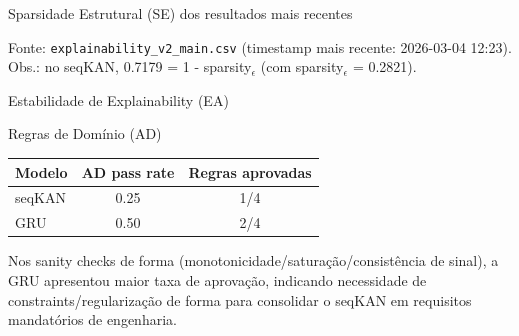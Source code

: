 \documentclass[10pt]{beamer}
\begin{document}
\begin{frame}{Sparsidade Estrutural (SE) dos resultados mais recentes}
\scriptsize
\centering
{}

\vspace{0.5em}
\tiny
Fonte: \texttt{explainability\_v2\_main.csv} (timestamp mais recente: 2026-03-04 12:23).\\
Obs.: no seqKAN, 0.7179 = 1 - sparsity$_\epsilon$ (com sparsity$_\epsilon$ = 0.2821).
\end{frame}

 


\begin{frame}{Estabilidade de Explainability (EA)}
\scriptsize
\centering
{}
\end{frame}


\begin{frame}{Regras de Dom\'inio (AD)}
\small
\centering
\begin{tabular}{l c c}
\toprule
Modelo & AD pass rate & Regras aprovadas \\
\midrule
seqKAN & 0.25 & 1/4 \\
GRU    & 0.50 & 2/4 \\
\bottomrule
\end{tabular}

\vspace{0.7em}
\scriptsize
Nos sanity checks de forma (monotonicidade/satura\c{c}\~ao/consist\^encia de sinal), a GRU apresentou maior taxa de aprova\c{c}\~ao, indicando necessidade de constraints/regulariza\c{c}\~ao de forma para consolidar o seqKAN em requisitos mandat\'orios de engenharia.
\end{frame}
\end{document}
